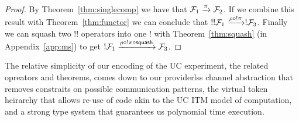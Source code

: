 \begin{proof}
By Theorem~\ref{thm:singlecomp} we have that $\mathcal{F}_1 \xrightarrow{\pi} \mathcal{F}_2$. If we combine this result with Theorem~\ref{thm:functor} we can conclude that $!!\mathcal{F}_1 \xrightarrow{\rho \circ !\pi} !\mathcal{F}_3$. 
Finally we can squash two $!!$ operators into one $!$ with Theorem~\ref{thm:squash} (in Appendix~\ref{app:ms}) to get $!\mathcal{F}_1 \xrightarrow{\rho \circ !\pi \circ \mathsf{squash}} \mathcal{F}_3$.
\end{proof}

The relative simplicity of our encoding of the UC experiment, the related opreators and theorems, comes down to our providerlss channel abstraction that removes constraits on possible communication patterns, the virtual token heirarchy that allows re-use of code akin to the UC ITM model of computation, and a strong type system that guarantees us polynomial time execution.


